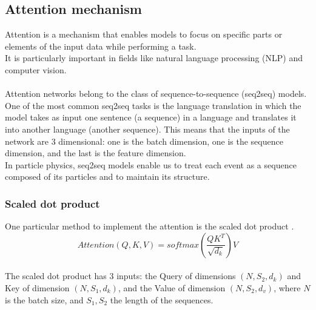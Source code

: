 \subsection{Attention mechanism}
Attention is a mechanism that enables models to focus on specific parts or elements of the input data while performing a task.\\
It is particularly important in fields like natural language processing (NLP) and computer vision.\\
\\
Attention networks belong to the class of sequence-to-sequence (seq2seq) models. 
One of the most common seq2seq tasks is the language translation in which the model takes as input one sentence (\ie a sequence) in a language and translates it into another language (\ie another sequence).
This means that the inputs of the network are 3 dimensional: one is the batch dimension, one is the sequence dimension, and the last is the feature dimension.\\
In particle physics, seq2seq models enable us to treat each event as a sequence composed of its particles and to maintain its structure.

\subsubsection*{Scaled dot product}
One particular method to implement the attention is the scaled dot product \cite{Vaswani2017AttentionNeed}.\\
\begin{equation}
    \textit{Attention}(Q,K,V)=\textit{softmax}\left(\frac{QK^T}{\sqrt{d_k}}\right)V
\end{equation}
\vspace{0.2cm}\\
The scaled dot product has 3 inputs\cite{Vaswani2017AttentionNeed}: the Query of dimensions $(N, S_2, d_k)$ and Key of dimension $(N, S_1, d_k)$, and the Value of dimension $(N, S_2, d_v)$, where $N$ is the batch size, and $S_1,S_2$ the length of the sequences.\\


